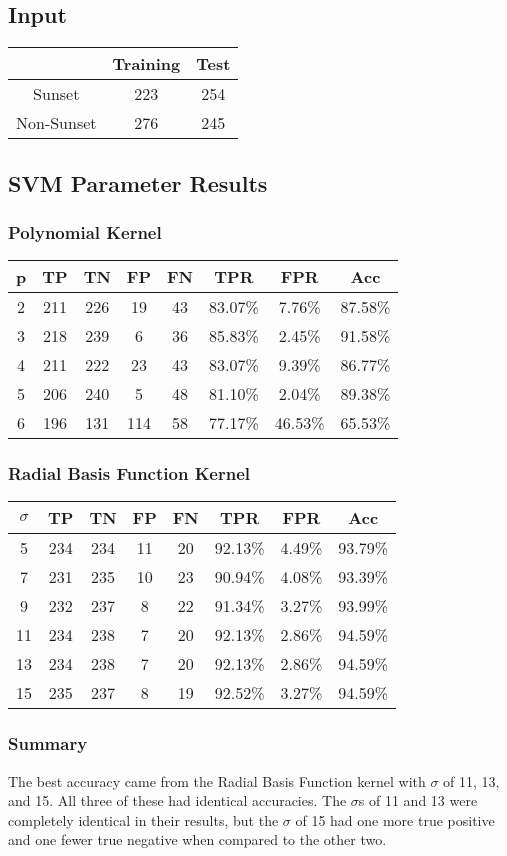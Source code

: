 \documentclass{article}
\begin{document}
\subsection{Input}
\begin{tabular}{ | c | c | c |}
\hline
 & Training & Test \\
\hline
Sunset & 223 & 254 \\
\hline
Non-Sunset & 276 & 245 \\
\hline
\end{tabular}

\subsection{SVM Parameter Results}
\subsubsection{Polynomial Kernel}
\begin{tabular}{ | c | c | c | c | c | c | c | c |}
\hline
p & TP & TN & FP & FN & TPR & FPR & Acc \\
\hline
2 & 211 & 226 & 19 & 43 & 83.07\% & 7.76\% & 87.58\% \\
\hline
3 & 218 & 239 & 6 & 36 & 85.83\% & 2.45\% & 91.58\% \\
\hline
4 & 211 & 222 & 23 & 43 & 83.07\% & 9.39\% & 86.77\% \\
\hline
5 & 206 & 240 & 5 & 48 & 81.10\% & 2.04\% & 89.38\% \\
\hline
6 & 196 & 131 & 114 & 58 & 77.17\% & 46.53\% & 65.53\% \\
\hline
\end{tabular}

\subsubsection{Radial Basis Function Kernel}
\begin{tabular}{ | c | c | c | c | c | c | c | c |}
\hline
\(\sigma\) & TP & TN & FP & FN & TPR & FPR & Acc \\
\hline
5 & 234 & 234 & 11 & 20 & 92.13\% & 4.49\% & 93.79\% \\
\hline
7 & 231 & 235 & 10 & 23 & 90.94\% & 4.08\% & 93.39\% \\
\hline
9 & 232 & 237 & 8 & 22 & 91.34\% & 3.27\% & 93.99\% \\
\hline
11 & 234 & 238 & 7 & 20 & 92.13\% & 2.86\% & 94.59\% \\
\hline
13 & 234 & 238 & 7 & 20 & 92.13\% & 2.86\% & 94.59\% \\
\hline
15 & 235 & 237 & 8 & 19 & 92.52\% & 3.27\% & 94.59\% \\
\hline
\end{tabular}

\subsubsection{Summary}
The best accuracy came from the Radial Basis Function kernel with \(\sigma\) of 11, 13, and 15.  All three of these had identical accuracies.  The \(\sigma\)s of 11 and 13 were completely identical in their results, but the \(\sigma\) of 15 had one more true positive and one fewer true negative when compared to the other two.
\end{document}
